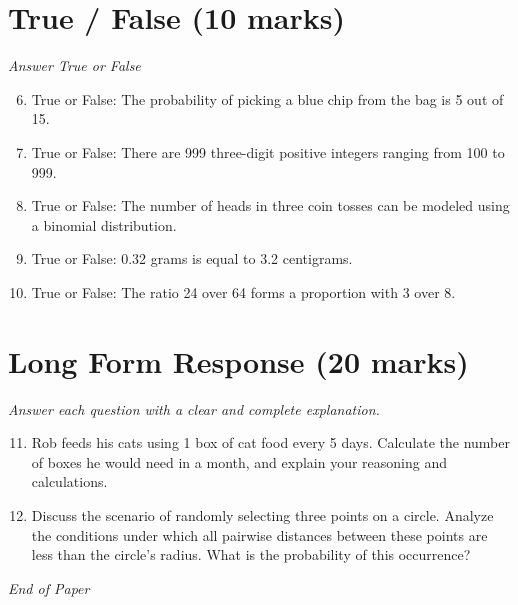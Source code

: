 \documentclass[12pt]{article}
\begin{document}
\section*{True / False (10 marks)}
\textit{Answer True or False}
\begin{enumerate}[label=\arabic*.]
\setcounter{enumi}{5}
\item True or False: The probability of picking a blue chip from the bag is 5 out of 15.
\item True or False: There are 999 three-digit positive integers ranging from 100 to 999.
\item True or False: The number of heads in three coin tosses can be modeled using a binomial distribution.
\item True or False: 0.32 grams is equal to 3.2 centigrams.
\item True or False: The ratio 24 over 64 forms a proportion with 3 over 8.
\end{enumerate}

\section*{Long Form Response (20 marks)}
\textit{Answer each question with a clear and complete explanation.}
\begin{enumerate}[label=\arabic*.]
\setcounter{enumi}{10}
\item Rob feeds his cats using 1 box of cat food every 5 days. Calculate the number of boxes he would need in a month, and explain your reasoning and calculations.
\item Discuss the scenario of randomly selecting three points on a circle. Analyze the conditions under which all pairwise distances between these points are less than the circle's radius. What is the probability of this occurrence?
\end{enumerate}

\vfill
\noindent\textit{End of Paper}
\end{document}
